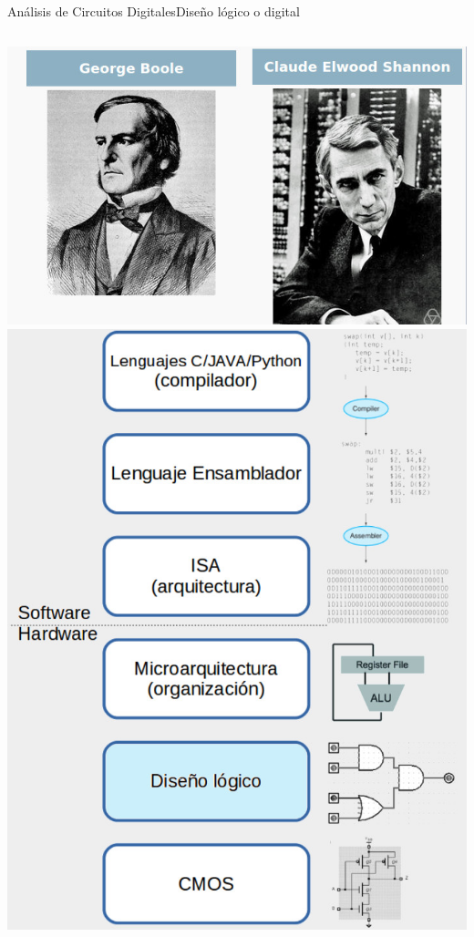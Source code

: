 \documentclass[aspectratio=169,compress]{beamer}
\begin{document}
\begin{footnotesize}
\begin{frame}{Análisis de Circuitos Digitales}{Diseño lógico o digital}
\begin{columns}[onlytextwidth,T]
\bigskip
\includegraphics[scale=0.3]{images/boole-shannon.jpg} 
      \column{60mm}
\includegraphics[scale=0.2]{images/abstraccion-logico.jpg} 

    \end{columns}
\end{frame}





\end{footnotesize}
\end{document}
